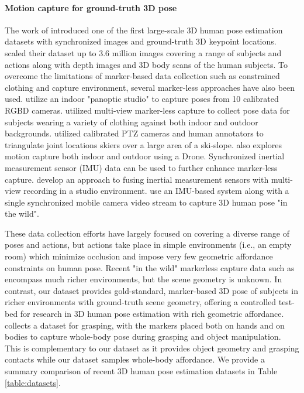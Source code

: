 \documentclass[times,referee,twocolumn,final,authoryear]{elsarticle}
\begin{document}
\paragraph{Motion capture for ground-truth 3D pose}
The work of \cite{humaneva} introduced one of the first large-scale 3D human pose estimation
datasets with synchronized images and ground-truth 3D keypoint locations.
\cite{h36m_pami} scaled their dataset up to 3.6 million images covering a range of
subjects and actions along with depth images and 3D body scans of the human subjects.
To overcome the limitations of marker-based data collection such as constrained clothing and 
capture environment, several marker-less approaches have also been used.  \cite{taotal} utilize 
an indoor "panoptic studio" to capture poses from 10 calibrated RGBD cameras.  \cite{mono_3dhp2017} 
utilized multi-view marker-less capture to collect pose data for subjects wearing a variety of 
clothing against both indoor and outdoor backgrounds.  \cite{cvpr18multiviewepfl} utilized calibrated PTZ 
cameras and human annotators to triangulate joint locations skiers over a large area of a ski-slope.
\cite{zhou2018drocap} also explores motion capture both indoor and outdoor using a Drone. 
Synchronized inertial measurement sensor (IMU) data can be used to further enhance marker-less 
capture. \cite{Trumble:BMVC:2017} develop an approach to fusing inertial measurement sensors with
multi-view recording in a studio environment. \cite{mono_3dhp2017} use an IMU-based system along 
with a single synchronized mobile camera video stream to capture 3D human pose "in the wild".

These data collection efforts have largely focused on covering a diverse range of poses and 
actions, but actions take place in simple environments (i.e., an empty room) which minimize
occlusion and impose very few geometric affordance constraints on human pose. Recent "in the wild" 
markerless capture data such as \cite{mono_3dhp2017} encompass much richer environments, but the 
scene geometry is unknown.  In contrast, our dataset provides gold-standard, marker-based 3D pose 
of subjects in richer environments with ground-truth scene geometry, offering a controlled 
test-bed for research in 3D human pose estimation with rich geometric affordance.
\cite{GRAB:2020} collects a dataset for grasping, with the markers placed both on hands and on bodies to capture whole-body pose during grasping and object manipulation. This is complementary to our dataset as it provides object geometry and 
grasping contacts while our dataset samples whole-body affordance. We 
provide a summary comparison of recent 3D human pose estimation datasets in Table \ref{table:datasets}.
\end{document}
